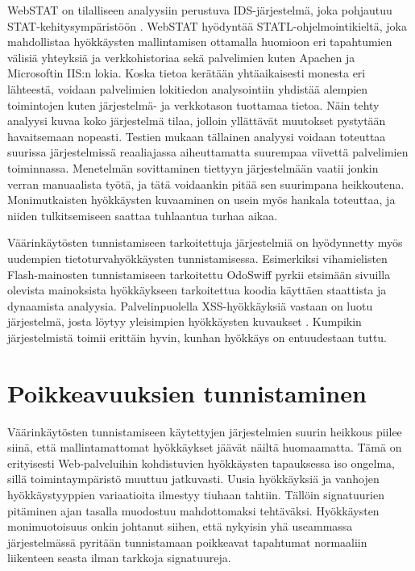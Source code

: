 WebSTAT \cite{Webstat} on tilalliseen analyysiin perustuva IDS-järjestelmä, joka pohjautuu STAT-kehitysympäristöön \cite{STAT}. WebSTAT hyödyntää STATL-ohjelmointikieltä, joka mahdollistaa hyökkäysten
mallintamisen ottamalla huomioon eri tapahtumien välisiä yhteyksiä ja verkkohistoriaa sekä palvelimien kuten Apachen ja Microsoftin IIS:n lokia. Koska tietoa kerätään yhtäaikaisesti monesta eri 
lähteestä, voidaan palvelimien lokitiedon analysointiin yhdistää alempien toimintojen kuten jär\-jes\-tel\-mä- ja verkkotason tuottamaa tietoa. Näin tehty analyysi kuvaa koko järjestelmä tilaa, jolloin 
yllättävät muutokset pystytään havaitsemaan nopeasti. Testien mukaan tällainen analyysi voidaan toteuttaa suurissa järjestelmissä reaaliajassa aiheuttamatta suurempaa viivettä palvelimien toiminnassa. 
Menetelmän sovittaminen tiettyyn järjestelmään vaatii jonkin verran manuaalista työtä, ja tätä voidaankin pitää sen suurimpana heikkoutena. Monimutkaisten hyökkäysten kuvaaminen on usein myös hankala
toteuttaa, ja niiden tulkitsemiseen saattaa tuhlaantua turhaa aikaa.

Väärinkäytösten tunnistamiseen tarkoitettuja järjestelmiä on hyödynnetty myös uudempien tietoturvahyökkäysten tunnistamisessa. Esimerkiksi vihamielisten Flash-mainosten tunnistamiseen tarkoitettu 
OdoSwiff \cite{FlashAdd} pyrkii etsimään sivuilla olevista mainoksista hyökkäykseen tarkoitettua koodia käyttäen staattista ja dynaamista analyysia. Palvelinpuolella XSS-hyökkäyksiä vastaan on luotu 
järjestelmä, josta löytyy yleisimpien hyökkäysten kuvaukset \cite{SignatureXSS}. Kumpikin järjestelmistä toimii erittäin hyvin, kunhan hyökkäys on entuudestaan tuttu.

\section{Poikkeavuuksien tunnistaminen}


Väärinkäytösten tunnistamiseen käytettyjen järjestelmien suurin heikkous piilee siinä, että mallintamattomat hyökkäykset jäävät näiltä huomaamatta. Tämä on erityisesti Web-palveluihin kohdistuvien
hyökkäysten tapauksessa iso ongelma, sillä toimintaympäristö muuttuu
jatkuvasti. Uusia hyökkäyksiä ja vanhojen hyökkäystyyppien variaatioita ilmestyy tiuhaan tahtiin. Tällöin signatuurien pitäminen ajan tasalla
muodostuu mahdottomaksi tehtäväksi. Hyökkäysten monimuotoisuus onkin johtanut siihen, että nykyisin yhä useammassa järjestelmässä pyritään tunnistamaan poikkeavat tapahtumat normaaliin liikenteen seasta
ilman tarkkoja signatuureja. 

